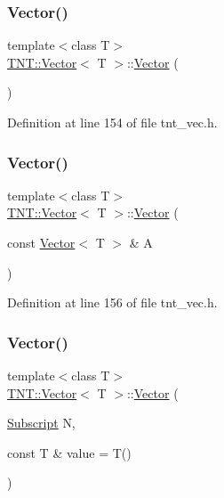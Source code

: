 \subsubsection{\texorpdfstring{Vector()}{Vector()}\hspace{0.1cm}{\footnotesize\ttfamily [1/5]}}
{\footnotesize\ttfamily template$<$class T$>$ \\
\hyperlink{classTNT_1_1Vector}{T\+N\+T\+::\+Vector}$<$ T $>$\+::\hyperlink{classTNT_1_1Vector}{Vector} (\begin{DoxyParamCaption}{ }\end{DoxyParamCaption})\hspace{0.3cm}{\ttfamily [inline]}}



Definition at line 154 of file tnt\+\_\+vec.\+h.

\mbox{\label{classTNT_1_1Vector_a271230d277812e5233ba912bd5932edc}} 
\subsubsection{\texorpdfstring{Vector()}{Vector()}\hspace{0.1cm}{\footnotesize\ttfamily [2/5]}}
{\footnotesize\ttfamily template$<$class T$>$ \\
\hyperlink{classTNT_1_1Vector}{T\+N\+T\+::\+Vector}$<$ T $>$\+::\hyperlink{classTNT_1_1Vector}{Vector} (\begin{DoxyParamCaption}\item[{const \hyperlink{classTNT_1_1Vector}{Vector}$<$ T $>$ \&}]{A }\end{DoxyParamCaption})\hspace{0.3cm}{\ttfamily [inline]}}



Definition at line 156 of file tnt\+\_\+vec.\+h.

\mbox{\label{classTNT_1_1Vector_aa329e3e0b9ef92bed1958b31d16742e2}} 
\subsubsection{\texorpdfstring{Vector()}{Vector()}\hspace{0.1cm}{\footnotesize\ttfamily [3/5]}}
{\footnotesize\ttfamily template$<$class T$>$ \\
\hyperlink{classTNT_1_1Vector}{T\+N\+T\+::\+Vector}$<$ T $>$\+::\hyperlink{classTNT_1_1Vector}{Vector} (\begin{DoxyParamCaption}\item[{\hyperlink{namespaceTNT_af22e3f1460e145c04ce4e7d701e4c1c1}{Subscript}}]{N,  }\item[{const T \&}]{value = {\ttfamily T()} }\end{DoxyParamCaption})\hspace{0.3cm}{\ttfamily [inline]}}




